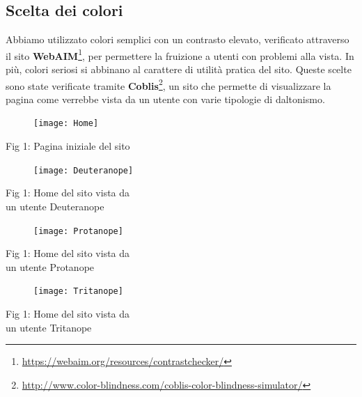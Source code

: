 \documentclass{tecweb}
\begin{document}
	\subsection{Scelta dei colori}
	Abbiamo utilizzato colori semplici con un contrasto elevato, 
	verificato attraverso il sito \textbf{WebAIM}\footnote{\url{https://webaim.org/resources/contrastchecker/}},
	per permettere la fruizione a utenti con problemi alla vista. In più, colori seriosi si abbinano al carattere di utilità pratica del sito.
	Queste scelte sono state verificate tramite \textbf{Coblis}\footnote{\url{http://www.color-blindness.com/coblis-color-blindness-simulator/}}, un sito che permette di visualizzare la pagina come verrebbe vista da un utente con varie tipologie di daltonismo.\\
	\begin{minipage}{0.5\textwidth}
		\begin{figure}[H]
			\flushleft\texttt{[image: Home]}
		\end{figure}
	\end{minipage}\hfill
	\begin{minipage}{0.5\textwidth}
		Fig 1: Pagina iniziale del sito	\\
	\end{minipage}
	\begin{minipage}{0.5\textwidth}
		\begin{figure}[H]
			\flushleft\texttt{[image: Deuteranope]}
		\end{figure}
	\end{minipage} \hfill
	\begin{minipage}{1\textwidth}
		Fig 1: Home del sito vista da\\ un utente Deuteranope	\\
	\end{minipage}
	\begin{minipage}{0.5\textwidth}
		\begin{figure}[H]
			\flushleft\texttt{[image: Protanope]}
		\end{figure}
	\end{minipage} \hfill
	\begin{minipage}{1\textwidth}
		Fig 1: Home del sito vista da\\ un utente Protanope	\\
	\end{minipage}
	\begin{minipage}{0.5\textwidth}
		\begin{figure}[H]
			\flushleft\texttt{[image: Tritanope]}
		\end{figure}
	\end{minipage} \hfill
	\begin{minipage}{1\textwidth}
		Fig 1: Home del sito vista da\\ un utente Tritanope	\\
	\end{minipage}
	\vspace{0.5cm}
	
\end{document}
